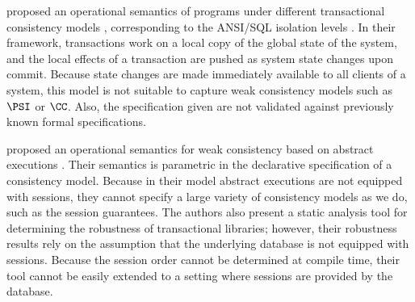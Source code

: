 \citeauthor{alonetogether} proposed an operational semantics of programs 
under different transactional consistency models \cite{alonetogether}, 
corresponding to the ANSI/SQL isolation levels \cite{si}.
In their  framework, transactions work on a local copy of the global state 
of the system, and the local effects of a transaction are pushed as 
system state changes upon commit. Because state changes 
are made immediately available to all clients of a system, this model 
is not suitable to capture weak consistency models such as \(\PSI\) or \(\CC\). 
Also, the specification given are not validated against previously known 
formal specifications.

\citeauthor{sureshConcur} proposed an operational semantics for weak consistency 
based on abstract executions \cite{sureshConcur}. Their semantics 
is parametric in the declarative specification of a consistency model. Because 
in their model abstract executions are not equipped with sessions, they cannot 
specify a large variety of consistency models as we do, such as the session guarantees. 
The authors also present a static analysis tool for determining the robustness of transactional 
libraries; however, their robustness results rely on the assumption that the underlying database 
is not equipped with sessions. Because the session order cannot be determined at compile time, 
their tool cannot be easily extended to a setting where sessions are provided by the database. 


